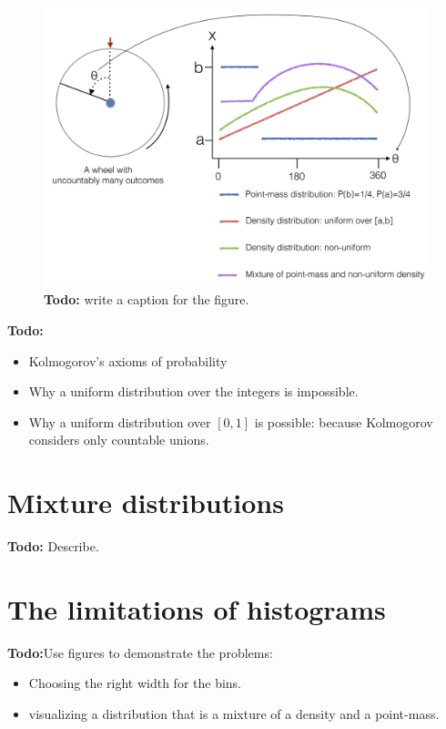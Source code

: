 \begin{figure}[th]
\begin{center}
\includegraphics[width=5in]{figs/WheelsOfChanceUncountable.png}
\end{center}
\caption{{\bf Todo:} write a caption for the figure.
\label{fig:Wheel-of-chance-uncountable}}
\end{figure}

{\bf Todo: } 
\begin{itemize}
\item Kolmogorov's axioms of probability
\item Why a uniform distribution over the integers is impossible.
\item Why a uniform distribution over $[0,1]$ is possible: because
  Kolmogorov considers only countable unions.
\end{itemize}


\section{Mixture distributions}

{\bf Todo:} Describe.
\section{The limitations of histograms}

{\bf Todo:}Use figures to demonstrate the problems:
\begin{itemize}
\item Choosing the right width for the bins.
\item visualizing a distribution that is a mixture of a density and a point-mass.
\end{itemize}

